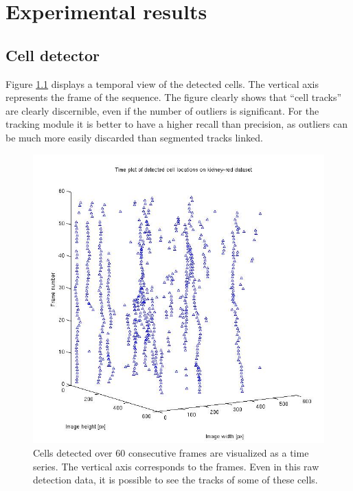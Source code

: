 \chapter{Experimental results }
\notyetimplemented{}
	\section{Cell detector }
		
	
		Figure \ref{fig:cell_tracks_detection} displays a temporal view of the detected cells. The vertical axis represents the frame of the sequence. The figure clearly shows that ``cell tracks'' are clearly discernible, even if the number of outliers is significant. For the tracking module it is better to have a higher recall than precision, as outliers can be much more easily discarded than segmented tracks linked.
		\begin{figure}
			  \includegraphics[width=\textwidth]{images/cell_tracks}
			\caption{Cells detected over 60 consecutive frames are visualized as a time series. The vertical axis corresponds to the frames. Even in this raw detection data, it is possible to see the tracks of some of these cells.}
		    \label{fig:cell_tracks_detection}
		\end{figure}
		
